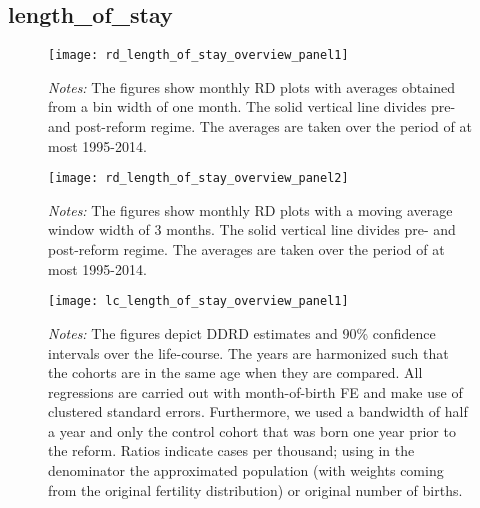 \subsection{length\_of\_stay}
\begin{landscape}
\begin{figure}[H]
	\centering
	\begin{minipage}{.95\linewidth}
	\texttt{[image: rd\_length\_of\_stay\_overview\_panel1]}
	{\scriptsize \emph{Notes:} The figures show monthly RD plots with averages obtained from a bin width of one month. The solid vertical line divides pre- and post-reform regime. The averages are taken over the period of at most 1995-2014. \par}
\end{minipage}
\end{figure}
\end{landscape}
\begin{landscape}
\begin{figure}[H]
	\centering
\begin{minipage}{.95\linewidth}
	\texttt{[image: rd\_length\_of\_stay\_overview\_panel2]}
	{\scriptsize \emph{Notes:} The figures show monthly RD plots with a moving average window width of 3 months. The solid vertical line divides pre- and post-reform regime. The averages are taken over the period of at most 1995-2014. \par}
\end{minipage}
\end{figure}
\end{landscape}


\begin{landscape}
\begin{figure}[H]
\centering
\begin{minipage}{.9\linewidth}
\texttt{[image: lc\_length\_of\_stay\_overview\_panel1]}
{\scriptsize \emph{Notes:} The figures depict DDRD estimates and 90\% confidence intervals over the life-course. The years are harmonized such that the cohorts are in the same age when they are compared. All regressions are carried out with month-of-birth FE and make use of clustered standard errors. Furthermore, we used a bandwidth of half a year and only the control cohort that was born one year prior to the reform. Ratios indicate cases per thousand; using in the denominator the approximated population (with weights coming from the original fertility distribution) or original number of births. \par}
\end{minipage}
\end{figure}
\end{landscape}
